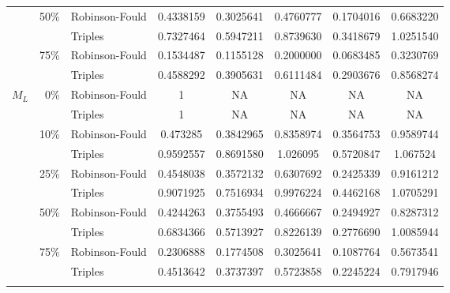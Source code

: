\documentclass[12pt,letterpaper]{article}
\begin{document}
\begin{table}
\begin{tabular}{rrlccccc}
              & 50\%         & Robinson-Fould & 0.4338159 & 0.3025641  & 0.4760777 & 0.1704016  & 0.6683220 \\
              &              & Triples        & 0.7327464 & 0.5947211  & 0.8739630 & 0.3418679  & 1.0251540 \\
              & 75\%         & Robinson-Fould & 0.1534487 & 0.1155128  & 0.2000000 & 0.0683485  & 0.3230769 \\
              &              & Triples        & 0.4588292 & 0.3905631  & 0.6111484 & 0.2903676  & 0.8568274 \\   
    $M_L$     & 0\%          & Robinson-Fould & 1 & NA  & NA & NA  & NA \\
              &              & Triples        & 1 & NA  & NA & NA  & NA \\
              & 10\%         & Robinson-Fould & 0.473285 & 0.3842965  & 0.8358974 & 0.3564753  & 0.9589744 \\
              &              & Triples        & 0.9592557 & 0.8691580  & 1.026095 & 0.5720847  & 1.067524 \\
              & 25\%         & Robinson-Fould & 0.4548038 & 0.3572132  & 0.6307692 & 0.2425339  & 0.9161212 \\
              &              & Triples        & 0.9071925 & 0.7516934  & 0.9976224 & 0.4462168  & 1.0705291 \\
              & 50\%         & Robinson-Fould & 0.4244263 & 0.3755493  & 0.4666667 & 0.2494927  & 0.8287312 \\
              &              & Triples        & 0.6834366 & 0.5713927  & 0.8226139 & 0.2776690  & 1.0085944 \\
              & 75\%         & Robinson-Fould & 0.2306888 & 0.1774508  & 0.3025641 & 0.1087764  & 0.5673541 \\
              &              & Triples        & 0.4513642 & 0.3737397  & 0.5723858 & 0.2245224  & 0.7917946 \\
    \hline
\label{NTSML_full}
\end{tabular}
\end{table}
\end{document}
